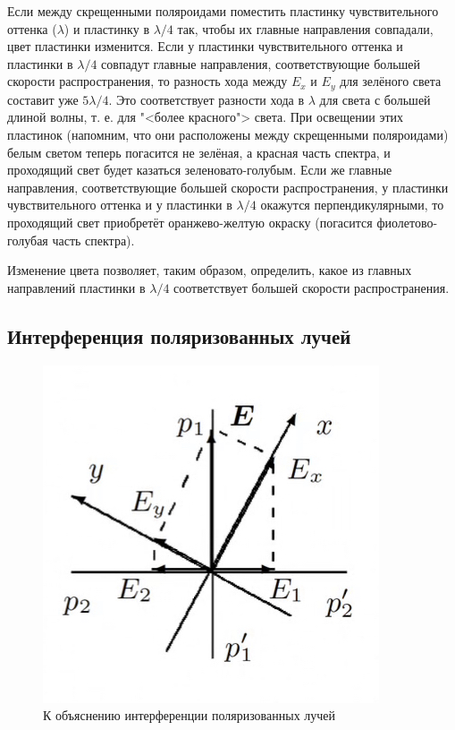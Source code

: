\documentclass[a4paper, 12pt]{article}
\begin{document}
Если между скрещенными поляроидами поместить пластинку чувствительного оттенка
($ \lambda $) и пластинку в $ \lambda/4 $ так, чтобы их главные
направления совпадали, цвет пластинки изменится. Если у пластинки чувствительного оттенка и пластинки в $ \lambda/4 $ совпадут главные направления, соответствующие большей скорости распространения, то разность хода между $ E_x $ и $ E_y $ для зелёного света составит уже $ 5\lambda/4 $. Это соответствует разности хода в $ \lambda $ для света с большей длиной волны, т. е. для "<более красного"> света. При освещении
этих пластинок (напомним, что они расположены между скрещенными поляроидами) белым светом теперь погасится не зелёная, а красная
часть спектра, и проходящий свет будет казаться зеленовато-голубым.
Если же главные направления, соответствующие большей скорости распространения, у пластинки чувствительного оттенка и у пластинки
в $ \lambda/4 $ окажутся перпендикулярными, то проходящий свет приобретёт
оранжево-желтую окраску (погасится фиолетово-голубая часть спектра).

Изменение цвета позволяет, таким образом, определить, какое из
главных направлений пластинки в $ \lambda/4 $ соответствует большей скорости
распространения.

\subsection{Интерференция поляризованных лучей}

\begin{figure}{}
	\includegraphics[scale=0.7]{4}
	\centering
	\caption{К объяснению интерференции
поляризованных лучей}
	\label{ris 4}
\end{figure}
\end{document}
